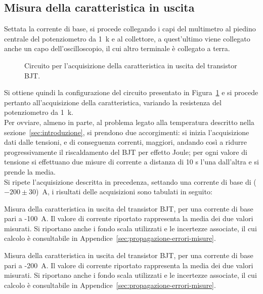 \documentclass[../main.tex]{subfiles}
\begin{document}
    \subsection*{Misura della caratteristica in uscita}
    Settata la corrente di base, si procede collegando i capi del multimetro al piedino
    centrale del potenziometro da 1~k\textohm\; e al collettore, a quest'ultimo
    viene collegato anche un capo dell'oscilloscopio, il cui altro terminale è collegato a terra.
    \begin{figure}[h!]
        \centering
        
        \caption{Circuito per l'acquisizione della caratteristica in uscita del transistor BJT.}
        \label{fig:circuito-caratteristica}
    \end{figure}

    \noindent Si ottiene quindi la configurazione del circuito presentato in Figura~\ref{fig:circuito-caratteristica}
    e si procede pertanto all'acquisizione della caratteristica, variando la
    resistenza del potenziometro da 1~k\textohm. \\

    Per ovviare, almeno in parte, al problema legato alla
    temperatura descritto nella sezione~\ref{sec:introduzione},
    si prendono due accorgimenti:
    si inizia l'acquisizione dati dalle tensioni, e di
    conseguenza correnti, maggiori, andando così a ridurre
    progressivamente il riscaldamento del BJT per effetto Joule;
    per ogni valore di tensione si effettuano due misure
    di corrente a distanza di 10 s l'una dall'altra e si prende la
    media.\\

    Si ripete l'acquisizione descritta in precedenza, settando una corrente di base
    di ($-200 \pm 30$)~\textmu A, i risultati delle acquisizioni sono tabulati in seguito:
    \clearpage
    \begin{table}[!ht]
        \centering
        
        \captionsetup{justification=centering} %
        \caption{Misura della caratteristica in uscita del transistor BJT, per una corrente di base pari a -100~\textmu A. Il
        valore di corrente riportato rappresenta la media dei due valori misurati. Si
        riportano anche i fondo scala utilizzati e le incertezze associate, il cui calcolo
        è consultabile in Appendice~\ref{sec:propagazione-errori-misure}.}
        \label{tab:100uA}

    \end{table}
    \begin{table}[!ht]
        \centering
        
        \captionsetup{justification=centering} %
        \caption{Misura della caratteristica in uscita del transistor BJT, per una corrente di base pari a -200~\textmu A. Il
        valore di corrente riportato rappresenta la media dei due valori misurati. Si
        riportano anche i fondo scala utilizzati e le incertezze associate, il cui calcolo
        è consultabile in Appendice~\ref{sec:propagazione-errori-misure}.}
        \label{tab:200uA}

    \end{table}
\end{document}

